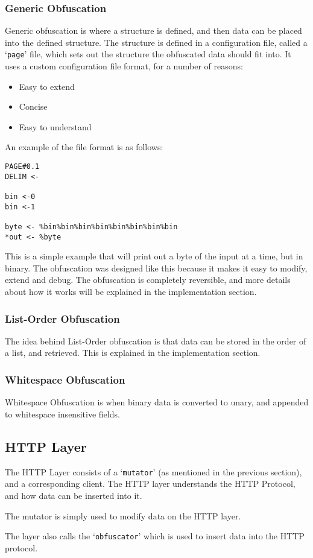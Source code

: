 \subsubsection{Generic Obfuscation}
Generic obfuscation is where a structure is defined, and then data can be placed into the defined structure.
The structure is defined in a configuration file, called a `\texttt{page}' file, which sets out the structure the obfuscated data should fit into. It uses a custom configuration file format, for a number of reasons:
\begin{itemize}
    \item Easy to extend
    \item Concise
    \item Easy to understand
\end{itemize}
An example of the file format is as follows:
\begin{verbatim}
PAGE#0.1
DELIM <-

bin <-0
bin <-1 

byte <- %bin%bin%bin%bin%bin%bin%bin%bin
*out <- %byte
\end{verbatim}
This is a simple example that will print out a byte of the input at a time, but in binary.
The obfuscation was designed like this because it makes it easy to modify, extend and debug.
The obfuscation is completely reversible, and more details about how it works will be explained in the implementation section.
\subsubsection{List-Order Obfuscation}
The idea behind List-Order obfuscation is that data can be stored in the order of a list, and retrieved. This is explained in the implementation section.

\subsubsection{Whitespace Obfuscation}
Whitespace Obfuscation is when binary data is converted to unary, and appended to whitespace insensitive fields.

\subsection{HTTP Layer}
The HTTP Layer consists of a `\texttt{mutator}' (as mentioned in the previous section), and a corresponding client. The HTTP layer understands the HTTP Protocol, and how data can be inserted into it.\par
The mutator is simply used to modify data on the HTTP layer.\par
The layer also calls the `\texttt{obfuscator}' which is used to insert data into the HTTP protocol.

